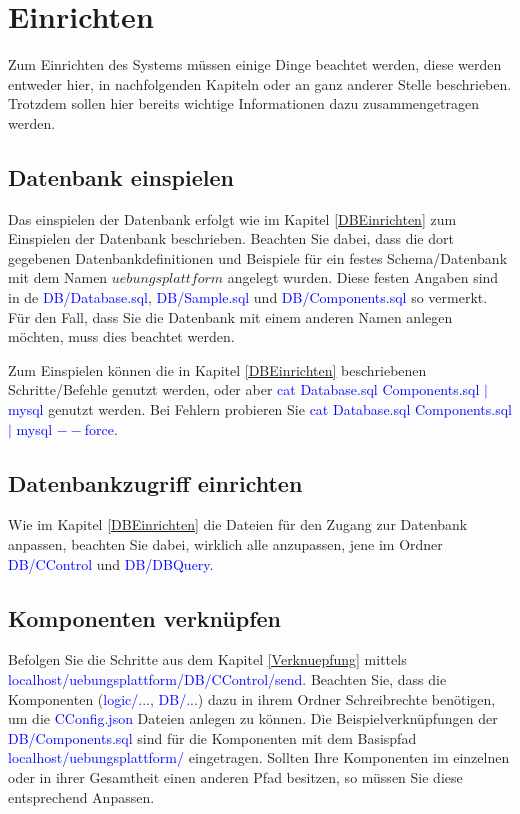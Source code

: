 \documentclass[10pt,a4paper,final,parskip]{scrartcl}
\newcommand{\blau}[1]{\textcolor{blue}{#1}}
\begin{document}
\tableofcontents
\cleardoublepage

\section{Einrichten}
Zum Einrichten des Systems müssen einige Dinge beachtet werden, diese werden entweder hier, in nachfolgenden Kapiteln oder an ganz anderer Stelle beschrieben. Trotzdem sollen hier bereits wichtige Informationen dazu zusammengetragen werden.

\subsection{ Datenbank einspielen}
Das einspielen der Datenbank erfolgt wie im Kapitel \ref{DBEinrichten} zum Einspielen der Datenbank beschrieben.
Beachten Sie dabei, dass die dort gegebenen Datenbankdefinitionen und Beispiele für ein festes Schema/Datenbank mit dem Namen $uebungsplattform$ angelegt wurden.
Diese festen Angaben sind in de \blau{DB/Database.sql}, \blau{DB/Sample.sql} und \blau{DB/Components.sql} so vermerkt. Für den Fall, dass Sie die Datenbank mit einem anderen Namen anlegen möchten, muss dies beachtet werden.

Zum Einspielen können die in Kapitel \ref{DBEinrichten} beschriebenen Schritte/Befehle genutzt werden, oder aber
\blau{cat Database.sql Components.sql $|$ mysql} genutzt werden.
Bei Fehlern probieren Sie \blau{cat Database.sql Components.sql $|$ mysql $--$force}.

\subsection{ Datenbankzugriff einrichten}
Wie im Kapitel \ref{DBEinrichten} die Dateien für den Zugang zur Datenbank anpassen, beachten Sie dabei, wirklich alle anzupassen, jene im Ordner \blau{DB/CControl} und \blau{DB/DBQuery}.

\subsection{ Komponenten verknüpfen}
Befolgen Sie die Schritte aus dem Kapitel \ref{Verknuepfung} mittels \blau{localhost/uebungsplattform/DB/CControl/send}. Beachten Sie, dass die Komponenten (\blau{logic/...}, \blau{DB/...}) dazu in ihrem Ordner Schreibrechte benötigen, um die \blau{CConfig.json} Dateien anlegen zu können.
Die Beispielverknüpfungen der \blau{DB/Components.sql} sind für die Komponenten mit dem Basispfad \blau{localhost/uebungsplattform/} eingetragen. Sollten Ihre Komponenten im einzelnen oder in ihrer Gesamtheit einen anderen Pfad besitzen, so müssen Sie diese entsprechend Anpassen.
\end{document}
